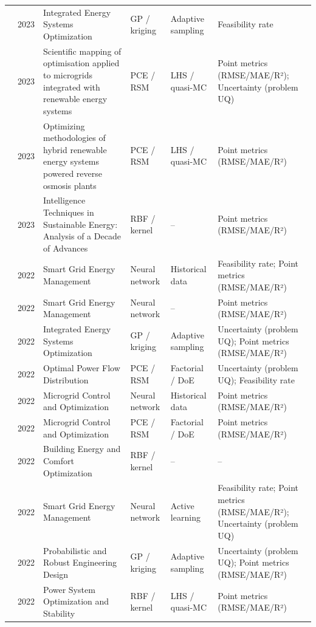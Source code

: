 \begin{longtable}{@{}p{} p{} p{} p{} p{} p{}@{}}
  \cite{Zheng20231907} & 2023 & Integrated Energy Systems Optimization & GP / kriging & Adaptive sampling & Feasibility rate \\
  \cite{arar_tahir_scientific_2023} & 2023 & Scientific mapping of optimisation applied to microgrids integrated with renewable energy systems & PCE / RSM & LHS / quasi-MC & Point metrics (RMSE/MAE/R²); Uncertainty (problem UQ) \\
  \cite{batista_optimizing_2023} & 2023 & Optimizing methodologies of hybrid renewable energy systems powered reverse osmosis plants & PCE / RSM & LHS / quasi-MC & Point metrics (RMSE/MAE/R²) \\
  \cite{velasquez_intelligence_2023} & 2023 & Intelligence Techniques in Sustainable Energy: Analysis of a Decade of Advances & RBF / kernel & -- & Point metrics (RMSE/MAE/R²) \\
  \cite{Chen2022} & 2022 & Smart Grid Energy Management & Neural network & Historical data & Feasibility rate; Point metrics (RMSE/MAE/R²) \\
  \cite{Chen2022__2} & 2022 & Smart Grid Energy Management & Neural network & -- & Point metrics (RMSE/MAE/R²) \\
  \cite{Dong2022} & 2022 & Integrated Energy Systems Optimization & GP / kriging & Adaptive sampling & Uncertainty (problem UQ); Point metrics (RMSE/MAE/R²) \\
  \cite{Fu2022} & 2022 & Optimal Power Flow Distribution & PCE / RSM & Factorial / DoE & Uncertainty (problem UQ); Feasibility rate \\
  \cite{Guo20222057} & 2022 & Microgrid Control and Optimization & Neural network & Historical data & Point metrics (RMSE/MAE/R²) \\
  \cite{Hussien20226442} & 2022 & Microgrid Control and Optimization & PCE / RSM & Factorial / DoE & Point metrics (RMSE/MAE/R²) \\
  \cite{Jia2022553} & 2022 & Building Energy and Comfort Optimization & RBF / kernel & -- & -- \\
  \cite{Kaewdornhan2022130373} & 2022 & Smart Grid Energy Management & Neural network & Active learning & Feasibility rate; Point metrics (RMSE/MAE/R²); Uncertainty (problem UQ) \\
  \cite{Liu20222679} & 2022 & Probabilistic and Robust Engineering Design & GP / kriging & Adaptive sampling & Uncertainty (problem UQ); Point metrics (RMSE/MAE/R²) \\
  \cite{Liu20223726} & 2022 & Power System Optimization and Stability & RBF / kernel & LHS / quasi-MC & Point metrics (RMSE/MAE/R²) \\

\end{longtable}
